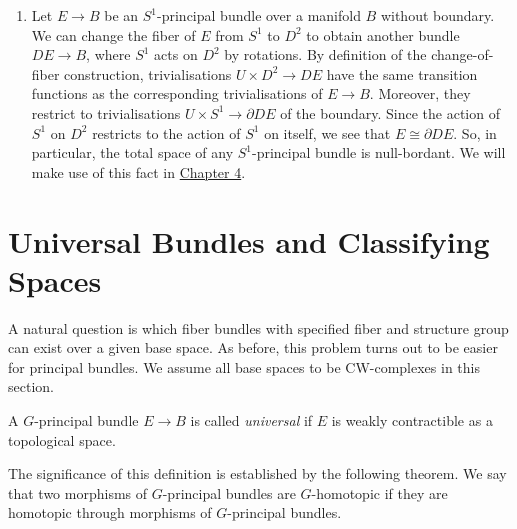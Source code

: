 \begin{example}
\begin{enumerate}[label=(\roman*)]
        \[
        \tau_1^n = \{(L,z) \in \CP^n \times \C^{n+1} \mid z \in L\}.
        \]
        So, explicitly,
        \[
        \mathrm{U}(\tau_1^n) = \{(L,z) \in \tau_1^n \mid \abs{z} = 1\}.
        \]
        Consider the diffeomorphism 
        \[
        \mathrm{U}(\tau_1^n) \to S^{2n+1}, \; (L,z) \mapsto z
        \]
        with inverse $S^{2n+1} \to \mathrm{U}(\tau_1^n),\; z \mapsto (\pi(z),z)$, where $\pi \colon S^{2n+1} \to \CP^n$ is the canonical projection. Under this diffeomorphism the restriction of $p$ to $\mathrm{U}(\tau_1^n)$ corresponds to $\pi$. Hence $\pi$ defines a $\mathrm{U}(1) \cong S^1$-principal bundle, which agrees with the associated principal bundle of $\tau_1^n \to \CP^n$.
        \item \label{bundles:ex:associated_bundles_part3} Let $E \to B$ be an $S^1$-principal bundle over a manifold $B$ without boundary. We can change the fiber of $E$ from $S^1$ to $D^2$ to obtain another bundle $DE \to B$, where $S^1$ acts on $D^2$ by rotations. By definition of the change-of-fiber construction, trivialisations $U \times D^2 \to DE$ have the same transition functions as the corresponding trivialisations of $E \to B$. Moreover, they restrict to trivialisations $U \times S^1 \to \partial DE$ of the boundary. Since the action of $S^1$ on $D^2$ restricts to the action of $S^1$ on itself, we see that $E \cong \partial DE$. So, in particular, the total space of any $S^1$-principal bundle is null-bordant. We will make use of this fact in \hyperref[chapter:main_construction]{Chapter 4}.
    \end{enumerate}
\end{example}


\section{Universal Bundles and Classifying Spaces}
A natural question is which fiber bundles with specified fiber and structure group can exist over a given base space. As before, this problem turns out to be easier for principal bundles. We assume all base spaces to be CW-complexes in this section.

\begin{definition}
    A $G$-principal bundle $E \to B$ is called \textit{universal} if $E$ is weakly contractible as a topological space.
\end{definition}

The significance of this definition is established by the following theorem. We say that two morphisms of $G$-principal bundles are $G$-homotopic if they are homotopic through morphisms of $G$-principal bundles.

